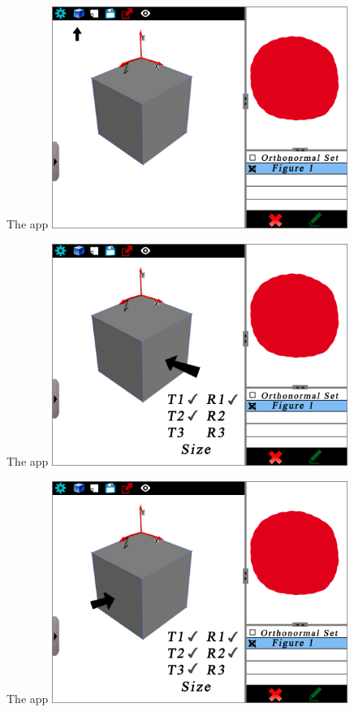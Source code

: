 \documentclass[a4paper,10pt]{beamer}
\begin{document}
			\begin{frame}{The app}
				\includegraphics[height=205pt]{maquette/maquette_4.png}
			\end{frame}
			
			\begin{frame}{The app}
				\includegraphics[height=205pt]{maquette/maquette_5.png}
			\end{frame}
			
			\begin{frame}{The app}
				\includegraphics[height=205pt]{maquette/maquette_6.png}
			\end{frame}
			
\end{document}
